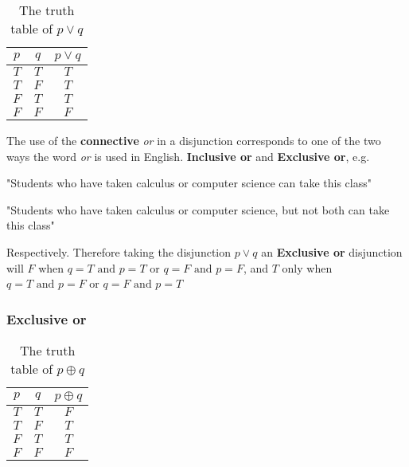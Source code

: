 \documentclass[12pt letter]{report}
\begin{document}
\begin{table}[h!]
  \caption{The truth table of $p \vee q$}\label{tab:3}
  \begin{center}
    \begin{tabular}{|c c|c|}
      \hline
      $p$ & $q$ & $p \vee q$ \\[0.5ex]
      \hline
      \hline
      $T$ & $T$ & $T$        \\
      $T$ & $F$ & $T$        \\
      $F$ & $T$ & $T$        \\
      $F$ & $F$ & $F$        \\
      \hline
    \end{tabular}
  \end{center}
\end{table}

The use of the \textbf{connective} \textit{or} in a disjunction corresponds to one of the two ways the word \textit{or}
is used in English. \textbf{Inclusive or} and \textbf{Exclusive or}, e.g.

"Students who have taken calculus or computer science can take this class"


"Students who have taken calculus or computer science, but not both can take this class"

Respectively. Therefore taking the disjunction $p \vee q$ an \textbf{Exclusive or} disjunction will $F$ when $q = T
  \text{ and } p = T$ or $q = F \text{ and } p = F$, and $T$ only when $q = T \text{ and } p = F$ or $q = F \text{ and
  } p = T$


\subsubsection{Exclusive or}

\begin{table}[h!]
  \caption{The truth table of $p \oplus q$}\label{tab:4}
  \begin{center}
    \begin{tabular}{|c c|c|}
      \hline
      $p$ & $q$ & $p \oplus q$ \\[0.5ex]
      \hline
      \hline
      $T$ & $T$ & $F$          \\
      $T$ & $F$ & $T$          \\
      $F$ & $T$ & $T$          \\
      $F$ & $F$ & $F$          \\
      \hline
    \end{tabular}
  \end{center}
\end{table}
\end{document}
